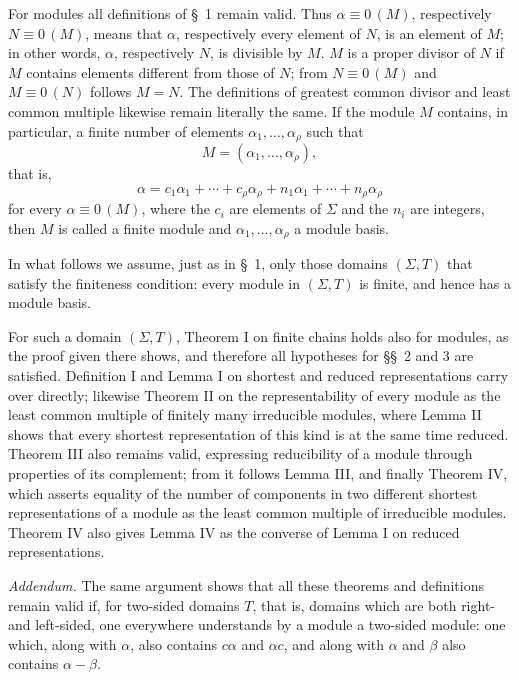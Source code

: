 \documentclass[11pt]{article}
\newcommand{\eqzero}[1]{\equiv 0\,(#1)}
\begin{document}
For modules all definitions of \S~1 remain valid. Thus $\alpha\eqzero{M}$, respectively $N\eqzero{M}$, means that $\alpha$, respectively every element of $N$, is an element of $M$; in other words, $\alpha$, respectively $N$, is divisible by $M$. $M$ is a proper divisor of $N$ if $M$ contains elements different from those of $N$; from $N\eqzero{M}$ and $M\eqzero{N}$ follows $M=N$. The definitions of greatest common divisor and least common multiple likewise remain literally the same. If the module $M$ contains, in particular, a finite number of elements $\alpha_1,
\ldots,\alpha_\rho$ such that
\[
 M=(\alpha_1,
\ldots,\alpha_\rho),
\]
that is,
\[
 \alpha=c_1\alpha_1+\cdots+c_\rho\alpha_\rho+n_1\alpha_1+\cdots+n_\rho\alpha_\rho
\]
for every $\alpha\eqzero{M}$, where the $c_i$ are elements of $\Sigma$ and the $n_i$ are integers, then $M$ is called a finite module and $\alpha_1,
\ldots,\alpha_\rho$ a module basis.

In what follows we assume, just as in \S~1, only those domains $(\Sigma,T)$ that satisfy the finiteness condition: every module in $(\Sigma,T)$ is finite, and hence has a module basis.

For such a domain $(\Sigma,T)$, Theorem I on finite chains holds also for modules, as the proof given there shows, and therefore all hypotheses for \S\S~2 and 3 are satisfied. Definition I and Lemma I on shortest and reduced representations carry over directly; likewise Theorem II on the representability of every module as the least common multiple of finitely many irreducible modules, where Lemma II shows that every shortest representation of this kind is at the same time reduced. Theorem III also remains valid, expressing reducibility of a module through properties of its complement; from it follows Lemma III, and finally Theorem IV, which asserts equality of the number of components in two different shortest representations of a module as the least common multiple of irreducible modules. Theorem IV also gives Lemma IV as the converse of Lemma I on reduced representations.

\emph{Addendum.} The same argument shows that all these theorems and definitions remain valid if, for two-sided domains $T$, that is, domains which are both right- and left-sided, one everywhere understands by a module a two-sided module: one which, along with $\alpha$, also contains $c\alpha$ and $\alpha c$, and along with $\alpha$ and $\beta$ also contains $\alpha-\beta$.
\end{document}

